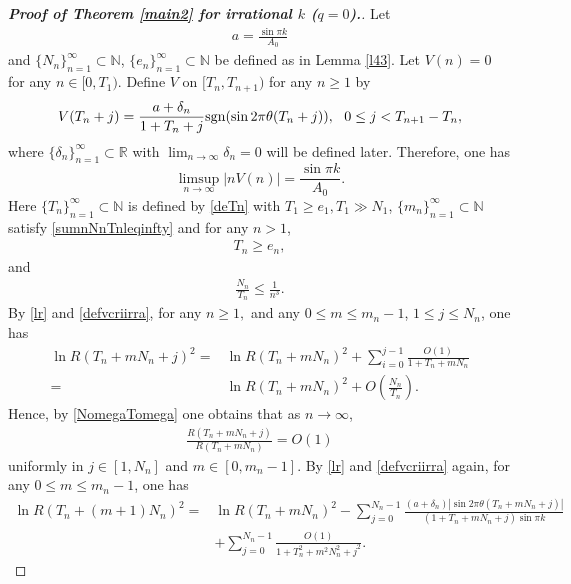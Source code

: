 \documentclass[12pt]{amsart}
\newcommand{\abs}[1]{\left\lvert #1 \right\rvert}
\theoremstyle{plain}
\newcommand{\R}{\mathbb{R}}
\theoremstyle{definition}
\begin{document}
	
	
	\begin{proof}[\textbf{Proof of Theorem \ref{main2} for irrational $k$ ($q=0$).}]
Let
	\begin{align}
			a=\frac{\sin\pi k}{A_0}\label{aA0sinpik}
		\end{align}
and $\{N_n\}_{n=1}^{\infty}\subset \mathbb{N}$, $\{e_n\}_{n=1}^\infty\subset\mathbb{N}$ be defined as in Lemma \ref{l43}.  Let $V(n)=0$ for any $n\in[0,T_1)$. Define $V$ on  $[T_{n},T_{n+1})$ for any $n\geq 1$ by
		\begin{align}
			V(T_n+j)=\frac{a+\delta_{n}}{1+T_n+j}{\rm{sgn}}(\sin2\pi\theta(T_n+j)),\ \ 0\leq j<T_{n+1}-T_n,\label{defvcriirra}
		\end{align}
		where $\{\delta_n\}_{n=1}^\infty\subset\R$ with $\lim_{n\to\infty}\delta_n=0$ will be defined later. Therefore, one has
		$$\limsup_{n\to \infty}\abs{nV(n)}=\frac{\sin\pi k}{A_0}.$$ 
		Here  $\{T_{n}\}_{n=1}^{\infty}\subset \mathbb{N}$ is defined by
\eqref{deTn}
with $T_1\geq e_1, T_1\gg N_1$, $\{m_n\}_{n=1}^\infty\subset\mathbb{N}$ satisfy \eqref{sumnNnTnleqinfty} and
for any $n>1$,
		\begin{align}\label{Tomeganomega}
			T_{n}\geq e_{n}, 
		\end{align}
and
		\begin{align}\label{NomegaTomega}
			\frac{N_{n}}{T_{n}}\leq \frac{1}{n^3}.
		\end{align}
By \eqref{lr} and \eqref{defvcriirra}, for any $n\geq 1,$ and any $0\leq m\leq m_n-1$, $1\leq j\leq N_n$, one has
\begin{align}
\ln R(T_n+mN_n+j)^2=&\ln R(T_n+mN_n)^2+\sum_{i=0}^{j-1}\frac{O(1)}{1+T_n+mN_n}\nonumber\\
=&\ln R(T_n+mN_n)^2+O\left(\frac{N_n}{T_n}\right).\nonumber
\end{align}
Hence, by \eqref{NomegaTomega} one obtains that as $n\to\infty$,
\begin{align}
\frac{R(T_n+mN_n+j)}{R(T_n+mN_n)}=O(1)\label{irraO1}
\end{align} 
uniformly in $j\in [1,N_n]$ and $m\in [0,m_n-1]$.
By \eqref{lr} and \eqref{defvcriirra} again, for any $0\leq m\leq m_{n}-1$, one has
		\begin{align}
			\ln R(T_{n}+(m+1)N_{n})^2=& \ln R(T_{n}+mN_{n})^2-\sum_{j=0}^{N_{n}-1}\frac{(a+\delta_{n})\abs{\sin2\pi\theta(T_{n}+mN_{n}+j)}}{(1+T_{n}+mN_{n}+j)\sin\pi k}\nonumber\\
&+\sum_{j=0}^{N_{n}-1}\frac{O(1)}{1+T_{n}^2+m^2N_n^2+j^2}.\nonumber
		\end{align}

\end{proof}
\end{document}
